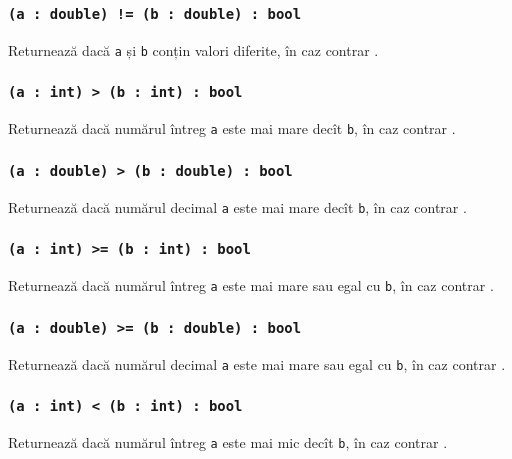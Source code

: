 \subsubsection{\texttt{(a : double) != (b : double) : bool}}

Returnează \true{} dacă \texttt{a} și \texttt{b} conțin valori diferite, în caz contrar \false{}.

\subsubsection{\texttt{(a : int) > (b : int) : bool}}

Returnează \true{} dacă numărul întreg \texttt{a} este mai mare decît \texttt{b}, în caz contrar \false{}.

\subsubsection{\texttt{(a : double) > (b : double) : bool}}

Returnează \true{} dacă numărul decimal \texttt{a} este mai mare decît \texttt{b}, în caz contrar \false{}.

\subsubsection{\texttt{(a : int) >= (b : int) : bool}}

Returnează \true{} dacă numărul întreg \texttt{a} este mai mare sau egal cu \texttt{b}, în caz contrar \false{}.

\subsubsection{\texttt{(a : double) >= (b : double) : bool}}

Returnează \true{} dacă numărul decimal \texttt{a} este mai mare sau egal cu \texttt{b}, în caz contrar \false{}.

\subsubsection{\texttt{(a : int) < (b : int) : bool}}

Returnează \true{} dacă numărul întreg \texttt{a} este mai mic decît \texttt{b}, în caz contrar \false{}.

